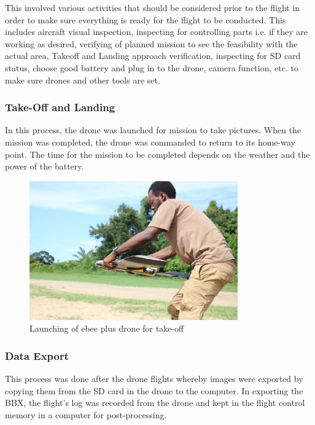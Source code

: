 \documentclass[a4paper,12pt,twoside]{article}
\begin{document}
        This involved various activities that should be considered prior to the flight in order to make sure everything is ready for the flight to be conducted. This includes aircraft visual inspection, inspecting for controlling parts i.e. if they are working as desired, verifying of planned mission to see the feasibility with the actual area, Takeoff and Landing approach verification, inspecting for SD card status, choose good battery and plug in to the drone, camera function, etc. to make sure drones and other tools are set.
    
    \subsubsection{Take-Off and Landing}
        In this process, the drone was launched for mission to take pictures. When the mission was completed, the drone was commanded to return to its home-way point. The time for the mission to be completed depends on the weather and the power of the battery.
    
        \begin{figure} %
            \centering
            \includegraphics[width=0.8\textwidth]{images/image6.jpg}
            \caption{Launching of ebee plus drone for take-off}
        \end{figure}
    
    \subsubsection{Data Export}
        This process was done after the drone flights whereby images were exported by copying them from the SD card in the drone to the computer. In exporting the BBX, the flight’s log was recorded from the drone and kept in the flight control memory in a computer for post-processing. 
    
\end{document}
